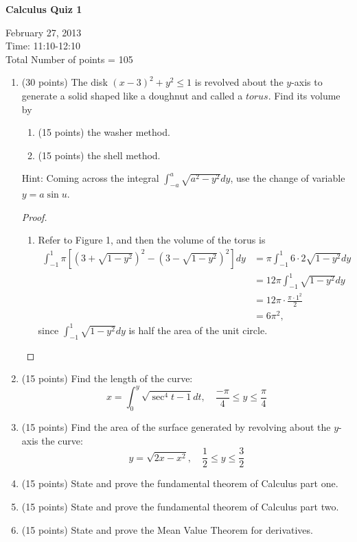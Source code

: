 \documentclass[12pt]{article}
\begin{document}
\begin{center}
{\Large \textbf{Calculus Quiz 1}}
\end{center}

\begin{flushright}
February 27, 2013\\
Time: 11:10-12:10\\
Total Number of points = 105
\end{flushright}

\begin{enumerate}
\item (30 points) The disk $(x−3)^2 +y^2 \le 1$ is revolved about the $y$-axis to generate a solid shaped like a doughnut and called a $torus$. Find its volume by
\begin{enumerate}
\item (15 points) the washer method.
\item (15 points) the shell method.
\end{enumerate}
Hint: Coming across the integral $\int^a_{-a}\sqrt{a^2-y^2}dy$, use the change of variable $y = a\sin u$.
\begin{proof}
\begin{enumerate}
\item Refer to Figure 1, and then the volume of the torus is
\begin{align*}
\int^1_{-1}\pi \left [\left (3+\sqrt{1-y^2}\right )^2-\left (3-\sqrt{1-y^2}\right)^2\right]dy&=\pi \int^1_{-1}6\cdot2\sqrt{1-y^2}dy\\
&=12\pi \int^1_{-1}\sqrt{1-y^2}dy\\
&=12\pi\cdot\frac{\pi\cdot 1^2}{2}\\
&=6\pi^2,
\end{align*}
since $\int^1_{-1}\sqrt{1-y^2}dy$ is half the area of the unit circle.
\end{enumerate}
\end{proof}
\item (15 points) Find the length of the curve:
\[
x=\int^y_0\sqrt{\sec^4t-1}dt,\quad \frac{-\pi}{4}\le y \le \frac{\pi}{4}
\]

\item (15 points) Find the area of the surface generated by revolving about the $y$-axis the curve:
\[
y=\sqrt{2x-x^2},\quad \frac{1}{2}\le y \le \frac{3}{2}
\]

\item (15 points) State and prove the fundamental theorem of Calculus part one.
\item (15 points) State and prove the fundamental theorem of Calculus part two.
\item (15 points) State and prove the Mean Value Theorem for derivatives.


\end{enumerate}
\end{document}
